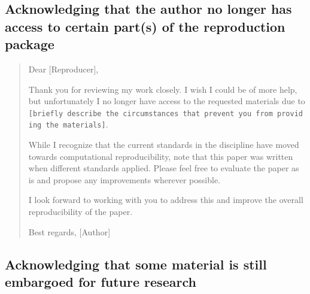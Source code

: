 \documentclass[
]{book}
\begin{document}
\hypertarget{acknowledging-that-the-author-no-longer-has-access-to-certain-parts-of-the-reproduction-package}{%
\subsection{Acknowledging that the author no longer has access to certain part(s) of the reproduction package}\label{acknowledging-that-the-author-no-longer-has-access-to-certain-parts-of-the-reproduction-package}}

\begin{quote}
Dear {[}Reproducer{]},

Thank you for reviewing my work closely. I wish I could be of more help, but unfortunately I no longer have access to the requested materials due to \texttt{{[}briefly\ describe\ the\ circumstances\ that\ prevent\ you\ from\ providing\ the\ materials{]}}.

While I recognize that the current standards in the discipline have moved towards computational reproducibility, note that this paper was written when different standards applied. Please feel free to evaluate the paper as is and propose any improvements wherever possible.

I look forward to working with you to address this and improve the overall reproducibility of the paper.

Best regards,
{[}Author{]}
\end{quote}

\hypertarget{acknowledging-that-some-material-is-still-embargoed-for-future-research}{%
\subsection{Acknowledging that some material is still embargoed for future research}\label{acknowledging-that-some-material-is-still-embargoed-for-future-research}}
\end{document}
